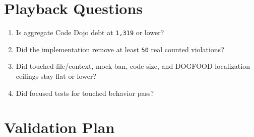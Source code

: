 \section{Playback Questions}\label{record-229-playback-questions}

\begin{enumerate}
\def\labelenumi{\arabic{enumi}.}
\tightlist
\item
  Is aggregate Code Dojo debt at \texttt{1\allowbreak{},\allowbreak{}3\allowbreak{}1\allowbreak{}9} or lower?
\item
  Did the implementation remove at least \texttt{5\allowbreak{}0} real counted violations?
\item
  Did touched file/context, mock-ban, code-size, and DOGFOOD localization ceilings stay flat or lower?
\item
  Did focused tests for touched behavior pass?
\end{enumerate}

\section{Validation Plan}\label{record-229-validation-plan}

